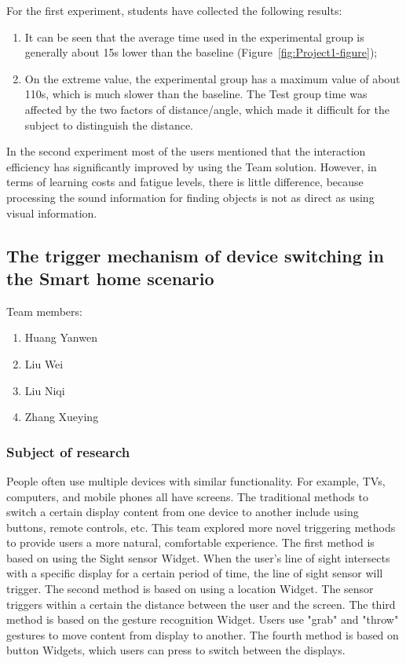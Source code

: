 For the first experiment, students have collected the following results:
\begin{enumerate}
    \item It can be seen that the average time used in the experimental group is generally about 15s lower than the baseline (Figure~\ref{fig:Project1-figure});
    \item On the extreme value, the experimental group has a maximum value of about 110s, which is much slower than the baseline. The Test group time was affected by the two factors of distance/angle, which made it difficult for the subject to distinguish the distance.
\end{enumerate}

In the second experiment most of the users mentioned that the interaction efficiency has significantly improved by using the Team solution. However, in terms of learning costs and fatigue levels, there is little difference, because processing the sound information for finding objects is not as direct as using visual information. 

\subsection{The trigger mechanism of device switching in the Smart home scenario}

Team members:
\begin{enumerate}
    \item Huang Yanwen 
    \item Liu Wei 
    \item Liu Niqi 
    \item Zhang Xueying 
\end{enumerate}

\subsubsection{Subject of research}

People often use multiple devices with similar functionality. For example, TVs, computers, and mobile phones all have screens. The traditional methods to switch a certain display content from one device to another include using buttons, remote controls, etc. This team explored more novel triggering methods to provide users a more natural, comfortable experience.
The first method is based on using the Sight sensor Widget. When the user's line of sight intersects with a specific display for a certain period of time, the line of sight sensor will trigger.
The second method is based on using a location Widget. The sensor triggers within a certain the distance between the user and the screen.
The third method is based on the gesture recognition Widget. Users use "grab" and "throw" gestures to move content from display to another. 
The fourth method is based on button Widgets, which users can press to switch between the displays.

